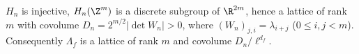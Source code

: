 $H_n$ is injective, $H_n(\Z^m)$ is a discrete subgroup of $\R^{2m}$, hence a lattice of rank $m$ with covolume $D_n=2^{m/2}|\det W_n|>0$, where $(W_n)_{j,i}=\lambda_{i+j}$ ($0\le i,j<m$). Consequently $\Lambda_f$ is a lattice of rank $m$ and covolume $D_n/\ell^{d_f}$.
